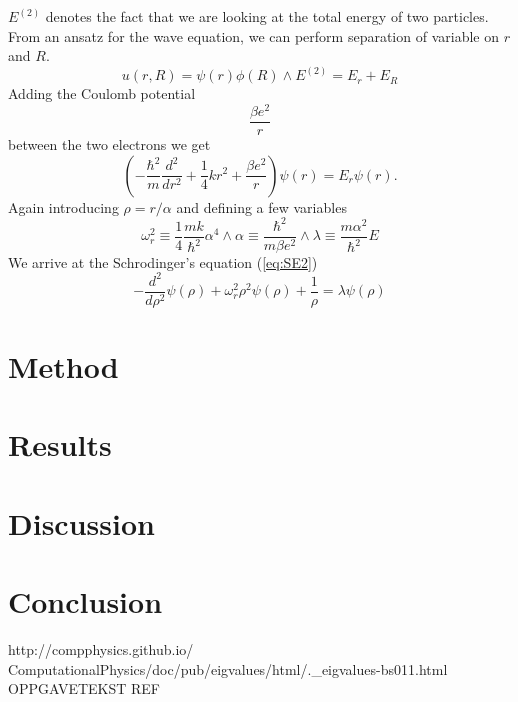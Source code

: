 \documentclass[reprint,english,notitlepage]{revtex4-1}  %
\begin{document}
$E^{(2)}$ denotes the fact that we are looking at the total energy of two particles. From an ansatz for the wave equation, we can perform separation of variable on $r$ and $R$.
\begin{equation*}
	u(r, R) = \psi(r)\phi(R) \wedge E^{(2)} = E_r + E_R
\end{equation*}
Adding the Coulomb potential
\begin{equation*}
	\frac{\beta e^2}{r}
\end{equation*}
between the two electrons we get
\begin{equation*}
	\left(  -\frac{\hbar^2}{m} \frac{d^2}{dr^2}+ \frac{1}{4}k r^2+\frac{\beta e^2}{r}\right)\psi(r)  = E_r \psi(r).
\end{equation*}
Again introducing $\rho = r/\alpha$ and defining a few variables
\begin{equation*}
	\omega_r^2\equiv \frac{1}{4}\frac{mk}{\hbar^2} \alpha^4 \wedge \alpha \equiv \frac{\hbar^2}{m\beta e^2} \wedge \lambda \equiv \frac{m\alpha^2}{\hbar^2}E
\end{equation*}
We arrive at the Schrodinger's equation (\ref{eq:SE2})
\begin{equation}
	-\frac{d^2}{d\rho^2}\psi(\rho) + \omega_r^2\rho^2\psi(\rho) + \frac{1}{\rho} = \lambda\psi(\rho)
	\label{eq:SE2}
\end{equation}

\section{Method}

\section{Results}

\section{Discussion}

\section{Conclusion}

\onecolumngrid
\begin{thebibliography}{}
 http://compphysics.github.io/
ComputationalPhysics/doc/pub/eigvalues/html/.\_eigvalues-bs011.html
 OPPGAVETEKST REF
\end{thebibliography}
\end{document}
